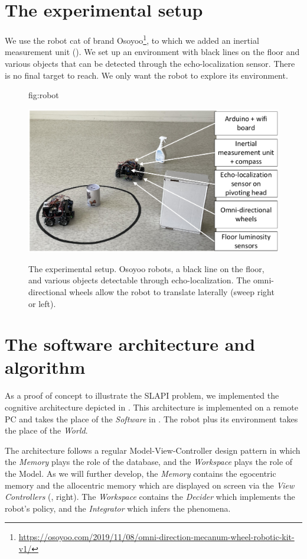 \documentclass[pmlr]{jmlr}%
\begin{document}
\section{The experimental setup}
\label{sec:experiment}

We use the robot cat of brand Osoyoo\footnote{\url{https://osoyoo.com/2019/11/08/omni-direction-mecanum-wheel-robotic-kit-v1/}}, to which we added an inertial measurement unit (). 
We set up an environment with black lines on the floor and various objects that can be detected through the echo-localization sensor. 
There is no final target to reach. We only want the robot to explore its environment. 

\begin{figure}[htbp]
	\floatconts
	{fig:robot}
	{\caption{The experimental setup. 
			Osoyoo robots, a black line on the floor, and various objects detectable through echo-localization.
		    The omni-directional wheels allow the robot to translate laterally (sweep right or left).}}
	{\includegraphics[width=0.7\linewidth]{images/Figure_1_Robotb}}
\end{figure}


\section{The software architecture and algorithm}
\label{sec:software}

As a proof of concept to illustrate the SLAPI problem, we implemented the cognitive architecture depicted in . 
This architecture is implemented on a remote PC and takes the place of the \textit{Software} in . The robot plus its environment takes the place of the \textit{World}.

The architecture follows a regular Model-View-Controller design pattern in which the \textit{Memory} plays the role of the database, and the \textit{Workspace} plays the role of the Model. 
As we will further develop, the \textit{Memory} contains the egocentric memory and the allocentric memory which are displayed on screen via the \textit{View Controllers} (, right).
The \textit{Workspace} contains the \textit{Decider} which implements the robot's policy, and the \textit{Integrator} which infers the phenomena. 
\end{document}
